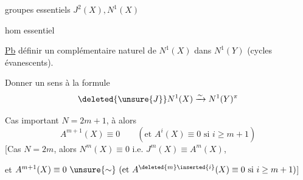 groupes essentiels \(J^2(X),N^1(X)\)

hom essentiel

\uline{Pb} définir un complémentaire naturel de \(N^1(X)\) dans \(N^1(Y)\) (cycles évanescents). 

Donner un sens à la formule
\[
\deleted{\unsure{J}}N^1(X)\xrightarrow{\sim}N^1(Y)^\pi
\]

Cas important \(N=2m+1\), à  alors
\[
A^{m+1}(X)\equiv0\qquad(\text{et }A^i(X)\equiv0\text{ si }i\geq m+1)
\]
[Cas \(N=2m\), alors \(N^m(X)\equiv0\) i.e. \(J^m(X)\equiv A^m(X)\),

et \(A^{m+1}(X)\equiv0\ \unsure{\sim}\ (\text{et }A^{\deleted{m}\inserted{i}}(X)\equiv0\text{ si }i\geq m+1)\)]

